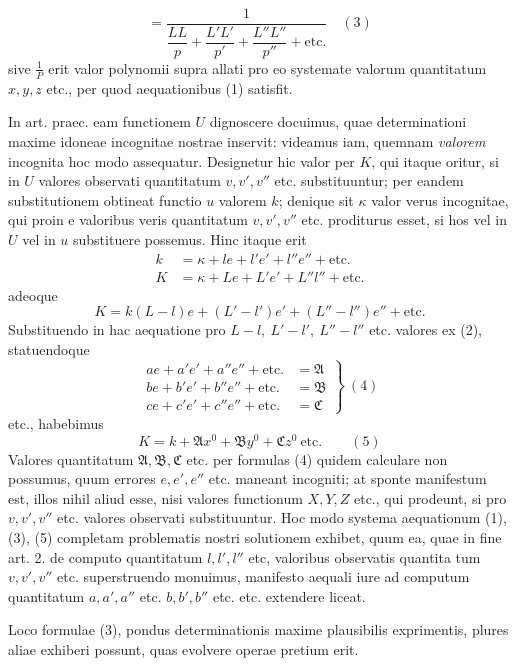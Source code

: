 \[
=\frac{1}{\dfrac{LL}{p}+\dfrac{L'L'}{p'}+\dfrac{L''L''}{p''}+\text{etc.}}\quad(3)
\]
sive \(\frac1P\) erit valor polynomii supra allati pro eo systemate valorum quantitatum \(x,y,z\) etc., per quod aequationibus (1) satisfit.

In art. praec. eam functionem \(U\) dignoscere docuimus, quae determinationi maxime idoneae incognitae nostrae inservit: videamus iam, quemnam \textit{valorem} incognita hoc modo assequatur. Designetur hic valor per \(K\), qui itaque oritur, si in \(U\) valores observati quantitatum \(v,v',v''\) etc. substituuntur; per eandem substitutionem obtineat functio \(u\) valorem \(k\); denique sit \(\kappa\) valor verus incognitae, qui proin e valoribus veris quantitatum \(v,v',v''\) etc. proditurus esset, si hos vel in \(U\) vel in \(u\) substituere possemus. Hinc itaque erit
\[
\begin{aligned}
k&=\kappa+le+l'e'+l''e''+\text{etc.}\\
K&=\kappa+Le+L'e'+L''l''+\text{etc.}
\end{aligned}
\]
adeoque
\[
K=k(L-l)e+(L'-l')e'+(L''-l'')e''+\text{etc.}
\]
Substituendo in hac aequatione pro \(L-l,\ L'-l',\ L''-l''\) etc. valores ex (2), statuendoque
\[
\left.\begin{aligned}
ae+a'e'+a''e''+\text{etc.}&=\mathfrak A\\
be+b'e'+b''e''+\text{etc.}&=\mathfrak B\\
ce+c'e'+c''e''+\text{etc.}&=\mathfrak C
\end{aligned}\right\}\ (4)
\]
etc., habebimus
\[
K=k+\mathfrak A x^0+\mathfrak B y^0+\mathfrak C z^0\ \text{etc.}\qquad(5)
\]
Valores quantitatum \(\mathfrak A,\mathfrak B,\mathfrak C\) etc. per formulas (4) quidem calculare non possumus, quum errores \(e,e',e''\) etc. maneant incogniti; at sponte manifestum est, illos nihil aliud esse, nisi valores functionum \(X,Y,Z\) etc., qui prodeunt, si pro \(v,v',v''\) etc. valores observati substituuntur. Hoc modo systema aequationum (1), (3), (5) completam problematis nostri solutionem exhibet, quum ea, quae in fine art. 2. de computo quantitatum \(l,l',l''\) etc, valoribus observatis quantita%
tum \(v,v',v''\) etc. superstruendo monuimus, manifesto aequali iure ad computum quantitatum \(a,a',a''\) etc. \(b,b',b''\) etc. etc. extendere liceat.

Loco formulae (3), pondus determinationis maxime plausibilis exprimentis, plures aliae exhiberi possunt, quas evolvere operae pretium erit.

